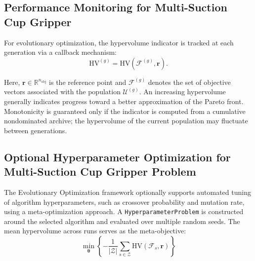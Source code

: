 \subsection{Performance Monitoring for Multi-Suction Cup Gripper}

For evolutionary optimization, the hypervolume indicator is tracked at each generation
via a callback mechanism:
\begin{equation}
    \mathrm{HV}^{(g)}
    =
    \mathrm{HV}\!\left(\mathcal{F}^{(g)},\mathbf{r}\right).
\end{equation}

Here, $\mathbf{r} \in \mathbb{R}^{n_{\text{obj}}}$ is the reference point and
$\mathcal{F}^{(g)}$ denotes the set of objective vectors associated with the population
$\mathcal{U}^{(g)}$. An increasing hypervolume generally indicates progress toward a better approximation of
the Pareto front. Monotonicity is guaranteed only if the indicator is computed from a
cumulative nondominated archive; the hypervolume of the current population may fluctuate
between generations.

\subsection{Optional Hyperparameter Optimization for Multi-Suction Cup Gripper Problem}

The Evolutionary Optimization framework optionally supports automated tuning of algorithm
hyperparameters, such as crossover probability and mutation rate, using a meta-optimization
approach. A \texttt{HyperparameterProblem} is constructed around the selected algorithm and
evaluated over multiple random seeds. The mean hypervolume across runs serves as the meta-objective:
\begin{equation}
    \min_{\boldsymbol{\theta}}
    \left\{
        -\frac{1}{|\mathcal{Z}|}
        \sum_{s \in \mathcal{Z}} \text{HV}(\mathcal{F}_s,\mathbf{r})
    \right\}
\end{equation}

